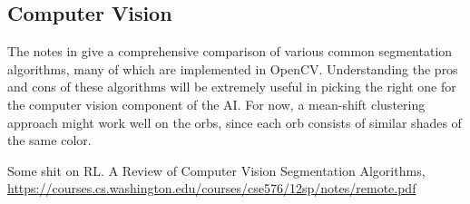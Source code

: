 \documentclass[journal,final,letterpaper,11pt]{IEEEtran}
\begin{document}
\subsection{Computer Vision}
The notes in \cite{2} give a comprehensive comparison of various common segmentation algorithms, many of which are implemented in OpenCV. Understanding the pros and cons of these algorithms will be extremely useful in picking the right one for the computer vision component of the AI. For now, a mean-shift clustering approach might work well on the orbs, since each orb consists of similar shades of the same color.

\begin{thebibliography}{1}

 Some shit on RL.
 A Review of Computer Vision Segmentation Algorithms, \url{https://courses.cs.washington.edu/courses/cse576/12sp/notes/remote.pdf}


\end{thebibliography}
\end{document}
